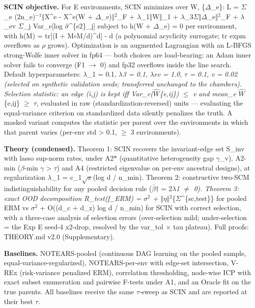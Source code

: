 \documentclass[11pt]{article}
\begin{document}
\textbf{SCIN objective.} For E environments, SCIN minimizes over
W, \{\(\Delta\)\_e\}: L = \(\Sigma\)\_e (2n\_e)\(^{-1}\)\(\Vert\)X\^{}e - X\^{}e(W + \(\Delta\)\_e)\(\Vert\)\(^2\)\_F + \(\lambda\)\_1\(\Vert\)W\(\Vert\)\_1 +
\(\lambda\)\_3\(\Sigma\)\(\Vert\)\(\Delta\)\_e\(\Vert\)\(^2\)\_F + \(\lambda\)\_ev \(\Sigma\)\_j Var\_e{[}log \(\hat{\sigma}\)\^{}\{e2\}\_j{]} subject to h(W + \(\Delta\)\_e) = 0
per environment, with h(M) = tr{[}(I + M\(\circ\)M/d)\^{}d{]} - d (a polynomial
acyclicity surrogate; tr expm overflows as \(\rho\) grows). Optimization is
an augmented Lagrangian with an L-BFGS strong-Wolfe inner solver in
fp64 --- both choices are load-bearing: an Adam inner solver fails to
converge (F1 \(\rightarrow\) 0) and fp32 overflows inside the line search. Default
hyperparameters: \(\lambda\)\_1 = 0.1, \(\lambda\)\emph{3 = 0.1, \(\lambda\)\emph{ev = 1.0, \(\tau\) = 0.1, v = 0.02
(selected on synthetic validation seeds; transferred unchanged to the
chambers). Selection statistic: an edge (i,j) is kept iff
Var\_e(\(\hat{W}\)}\{e,ij\}) \(\leq\) v and mean\_e \textbar{}\(\hat{W}\)}\{e,ij\}\textbar{} \(\geq\) \(\tau\), evaluated in raw
(standardization-reversed) units --- evaluating the equal-variance
criterion on standardized data silently penalizes the truth. A masked
variant computes the statistic per parent over the environments in
which that parent varies (per-env std \textgreater{} 0.1, \(\geq\) 3 environments).

\textbf{Theory (condensed).} Theorem 1: SCIN recovers the invariant-edge
set S\_inv with lasso sup-norm rates, under A2\(\ast\) (quantitative
heterogeneity gap \(\gamma\)\_v), A2-min (\(\beta\)-min \(\gamma\) \textgreater{} \(\tau\)) and A4 (restricted
eigenvalue on per-env ancestral designs), at regularization \(\lambda\)\_1 =
c\_1\(\sqrt{x}\)(log d / n\_min). Theorem 2: constructive two-SCM
indistinguishability for any pooled decision rule (\(\bar{\beta}\)\(\dagger\) = 2\(\lambda\)\emph{1 \(\neq\) 0).
Theorem 3: exact OOD decomposition R\_test(f\_ERM) = \(\sigma\)\(^2\) +
\(\Vert\)\(\eta\)\(\Vert\)\(^2\)}\{\(\Sigma\)\^{}\{s\textbar c,test\}\} for pooled ERM vs \(\sigma\)\(^2\) + O((d\_c + d\_z) log d /
n\_min) for SCIN with correct selection, with a three-case analysis of
selection errors (over-selection mild; under-selection = the Exp E
seed-4 x2-drop, resolved by the var\_tol \(\times\) tau plateau). Full proofs:
THEORY.md v2.0 (Supplementary).

\textbf{Baselines.} NOTEARS-pooled (continuous DAG learning on the pooled
sample, equal-variance-regularized), NOTEARS-per-env with edge-set
intersection, V-REx (risk-variance penalized ERM), correlation
thresholding, node-wise ICP with exact subset enumeration and pairwise
F-tests under A1, and an Oracle fit on the true parents. All baselines
receive the same \(\tau\)-sweep as SCIN and are reported at their best \(\tau\).
\end{document}
